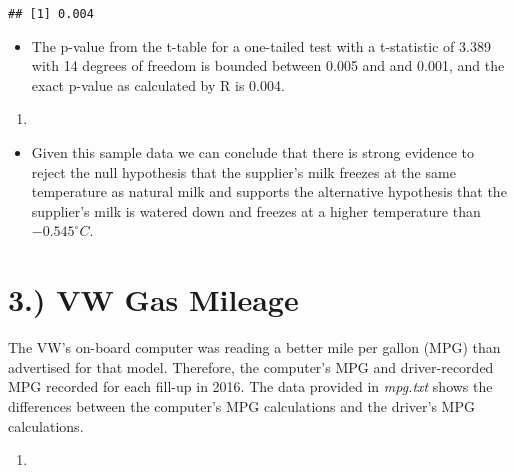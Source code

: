 \documentclass[]{article}
\newenvironment{Shaded}{\begin{snugshade}}{\end{snugshade}}
\newcommand{\KeywordTok}[1]{\textcolor[rgb]{0.13,0.29,0.53}{\textbf{#1}}}
\newcommand{\DecValTok}[1]{\textcolor[rgb]{0.00,0.00,0.81}{#1}}
\newcommand{\StringTok}[1]{\textcolor[rgb]{0.31,0.60,0.02}{#1}}
\newcommand{\OperatorTok}[1]{\textcolor[rgb]{0.81,0.36,0.00}{\textbf{#1}}}
\newcommand{\NormalTok}[1]{#1}
\providecommand{\tightlist}{%
  \setlength{\itemsep}{0pt}\setlength{\parskip}{0pt}}
\begin{document}
\begin{verbatim}
## [1] 0.004
\end{verbatim}

\begin{itemize}
\tightlist
\item
  The p-value from the t-table for a one-tailed test with a t-statistic
  of 3.389 with 14 degrees of freedom is bounded between 0.005 and and
  0.001, and the exact p-value as calculated by R is 0.004.
\end{itemize}

\begin{enumerate}
\def\labelenumi{(\alph{enumi})}
\setcounter{enumi}{3}
\item
\end{enumerate}

\begin{itemize}
\tightlist
\item
  Given this sample data we can conclude that there is strong evidence
  to reject the null hypothesis that the supplier's milk freezes at the
  same temperature as natural milk and supports the alternative
  hypothesis that the supplier's milk is watered down and freezes at a
  higher temperature than \(-0.545^{\circ}C\).
\end{itemize}

\section{3.) VW Gas Mileage}\label{vw-gas-mileage}

The VW's on-board computer was reading a better mile per gallon (MPG)
than advertised for that model. Therefore, the computer's MPG and
driver-recorded MPG recorded for each fill-up in 2016. The data provided
in \emph{mpg.txt} shows the differences between the computer's MPG
calculations and the driver's MPG calculations.

\begin{enumerate}
\def\labelenumi{(\alph{enumi})}
\item
\end{enumerate}

\begin{Shaded}
\end{Shaded}
\end{document}
